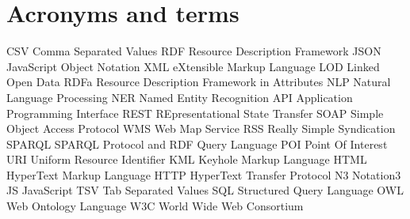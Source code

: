 \section{Acronyms and terms}
    CSV     Comma Separated Values
    RDF     Resource Description Framework
    JSON    JavaScript Object Notation
    XML     eXtensible Markup Language
    LOD     Linked Open Data
    RDFa    Resource Description Framework in Attributes
    NLP     Natural Language Processing
    NER     Named Entity Recognition
    API     Application Programming Interface
    REST    REpresentational State Transfer
    SOAP    Simple Object Access Protocol
    WMS     Web Map Service
    RSS     Really Simple Syndication
    SPARQL  SPARQL Protocol and RDF Query Language
    POI     Point Of Interest
    URI     Uniform Resource Identifier
    KML     Keyhole Markup Language
    HTML    HyperText Markup Language
    HTTP    HyperText Transfer Protocol
    N3      Notation3
    JS      JavaScript
    TSV     Tab Separated Values
    SQL     Structured Query Language
    OWL     Web Ontology Language
    W3C     World Wide Web Consortium
